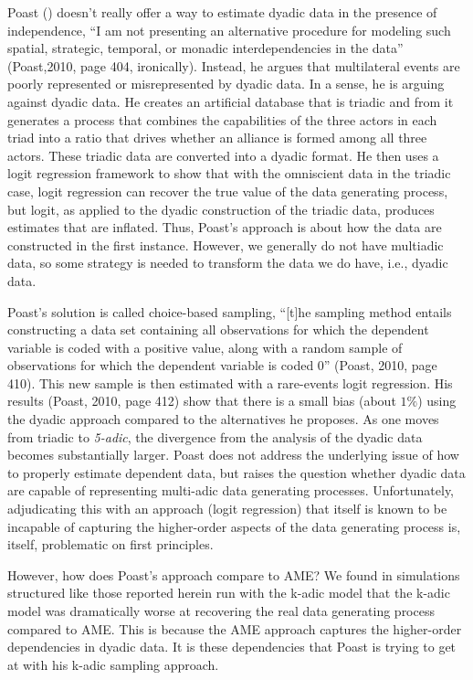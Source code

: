 Poast (\citeyear{poast:2010,poast:2016}) doesn't really offer a way to estimate dyadic data in the presence of independence,
``I am not presenting an alternative procedure for modeling such spatial, strategic, temporal,
or monadic interdependencies in the data'' (Poast,2010, page 404, ironically). Instead, he argues that multilateral events are poorly represented or misrepresented by dyadic data.  In a sense, he is arguing against dyadic data.  He creates an artificial database that is triadic and from it generates a process that combines the capabilities of the three actors in each triad into a ratio that drives whether an alliance is formed among all three actors.  These triadic data are converted into a dyadic format. He then uses a logit regression framework to show that with the omniscient data in the triadic case, logit regression can recover the true value of the data generating process, but logit, as applied to the dyadic construction of the triadic data, produces estimates that are inflated. Thus, Poast's approach is about how the data are constructed in the first instance. However, we generally do not have multiadic data, so some strategy is needed to transform the data we do have, i.e., dyadic data.

Poast's solution is called choice-based sampling, ``[t]he sampling method entails constructing a data set containing all observations for which the dependent variable is coded with a positive value, along with a random sample of observations for which the dependent variable is coded 0'' (Poast, 2010, page 410). This new sample is then estimated with a rare-events logit regression. His results (Poast, 2010, page 412) show that there is a small bias (about $1\%$) using the dyadic approach compared to the alternatives he proposes.  As one moves from triadic to \textit{5-adic}, the divergence from the analysis of the dyadic data becomes substantially larger. Poast does not address the underlying issue of how to properly estimate dependent data, but raises the question whether dyadic data are capable of representing multi-adic data generating processes.  Unfortunately, adjudicating this with an approach (logit regression) that itself is known to be incapable of capturing the higher-order aspects of the data generating process is, itself, problematic on first principles.  

However, how does Poast's approach compare to AME? We found in simulations structured like those reported herein run with the k-adic model that the k-adic model was dramatically worse at recovering the real data generating process compared to AME. This is because the AME approach captures the higher-order dependencies in dyadic data. It is these dependencies that Poast is trying to get at with his k-adic sampling approach. 


